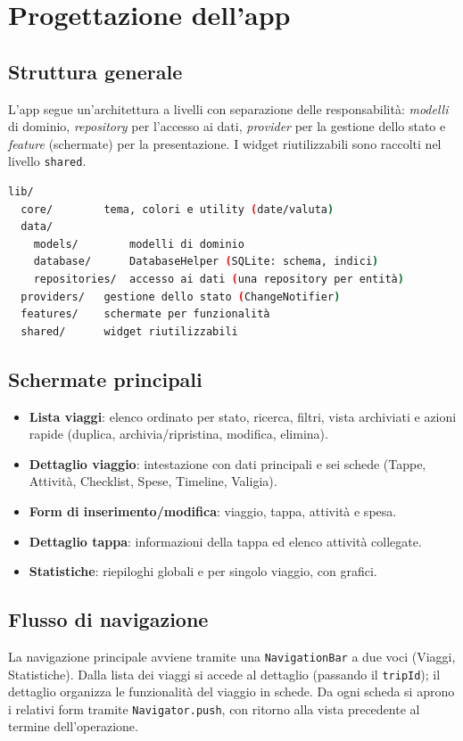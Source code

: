 \documentclass[11pt, a4paper]{article}
\begin{document}
\section{Progettazione dell'app}

\subsection{Struttura generale}
L'app segue un'architettura a livelli con separazione delle responsabilità:
\emph{modelli} di dominio, \emph{repository} per l'accesso ai dati, \emph{provider} per
la gestione dello stato e \emph{feature} (schermate) per la presentazione. I widget
riutilizzabili sono raccolti nel livello \texttt{shared}.

\begin{lstlisting}[language=bash, basicstyle=\ttfamily\footnotesize]
lib/
  core/        tema, colori e utility (date/valuta)
  data/
    models/        modelli di dominio
    database/      DatabaseHelper (SQLite: schema, indici)
    repositories/  accesso ai dati (una repository per entità)
  providers/   gestione dello stato (ChangeNotifier)
  features/    schermate per funzionalità
  shared/      widget riutilizzabili
\end{lstlisting}

\subsection{Schermate principali}
\begin{itemize}[nosep]
    \item \textbf{Lista viaggi}: elenco ordinato per stato, ricerca, filtri, vista
    archiviati e azioni rapide (duplica, archivia/ripristina, modifica, elimina).
    \item \textbf{Dettaglio viaggio}: intestazione con dati principali e sei schede
    (Tappe, Attività, Checklist, Spese, Timeline, Valigia).
    \item \textbf{Form di inserimento/modifica}: viaggio, tappa, attività e spesa.
    \item \textbf{Dettaglio tappa}: informazioni della tappa ed elenco attività collegate.
    \item \textbf{Statistiche}: riepiloghi globali e per singolo viaggio, con grafici.
\end{itemize}

\subsection{Flusso di navigazione}
La navigazione principale avviene tramite una \texttt{NavigationBar} a due voci
(Viaggi, Statistiche). Dalla lista dei viaggi si accede al dettaglio (passando il
\texttt{tripId}); il dettaglio organizza le funzionalità del viaggio in schede. Da ogni
scheda si aprono i relativi form tramite \texttt{Navigator.push}, con ritorno alla vista
precedente al termine dell'operazione.
\end{document}
